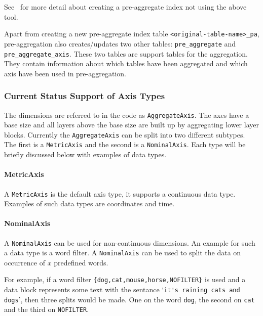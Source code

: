 
See~ for more detail about creating a
pre-aggregate index not using the above tool.

Apart from creating a new pre-aggregate index table
\lstinline|<original-table-name>_pa|, pre-aggregation also creates/updates
two other tables: \lstinline|pre_aggregate| and
\lstinline|pre_aggregate_axis|. These two tables are support tables for the
aggregation. They contain information about which tables have been
aggregated and which axis have been used in pre-aggregation.

\subsubsection{Current Status Support of Axis Types}

The dimensions are referred to in the code as \lstinline|AggregateAxis|.
The axes have a base size and all layers above the base size are built up
by aggregating lower layer blocks. Currently the \lstinline|AggregateAxis|
can be split into two different subtypes. The first is a
\lstinline|MetricAxis| and the second is a \lstinline|NominalAxis|. Each
type will be briefly discussed below with examples of data types.

\paragraph{MetricAxis}
A \lstinline|MetricAxis| is the default axis type, it supports a continuous
data type. Examples of such data types are coordinates and time.

\paragraph{NominalAxis}
A \lstinline|NominalAxis| can be used for non-continuous dimensions. An
example for such a data type is a word filter. A \lstinline|NominalAxis|
can be used to split the data on occurrence of $x$ predefined words. 

For example, if a word filter \lstinline|{dog,cat,mouse,horse,NOFILTER}| is
used and a data block represents some text with the sentance
`\lstinline|it's raining cats and dogs|', then three splits would be made.
One on the word \lstinline|dog|, the second on \lstinline|cat| and the
third on \lstinline|NOFILTER|.

